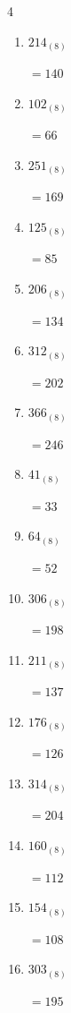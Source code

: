 \begin{multicols}{4}
\begin{enumerate}
        $=241$

  \item $214_{(8)}$

        $=140$

  \item $102_{(8)}$

        $=66$

\columnbreak %

  \item $251_{(8)}$

        $=169$

  \item $125_{(8)}$

        $=85$

  \item $206_{(8)}$

        $=134$

  \item $312_{(8)}$

        $=202$

  \item $366_{(8)}$

        $=246$

  \item $41_{(8)}$

        $=33$

  \item $64_{(8)}$

        $=52$

  \item $306_{(8)}$

        $=198$

  \item $211_{(8)}$

        $=137$

  \item $176_{(8)}$

        $=126$

  \item $314_{(8)}$

        $=204$

  \item $160_{(8)}$

        $=112$

  \item $154_{(8)}$

        $=108$

  \item $303_{(8)}$

        $=195$


\end{enumerate}
\end{multicols}

